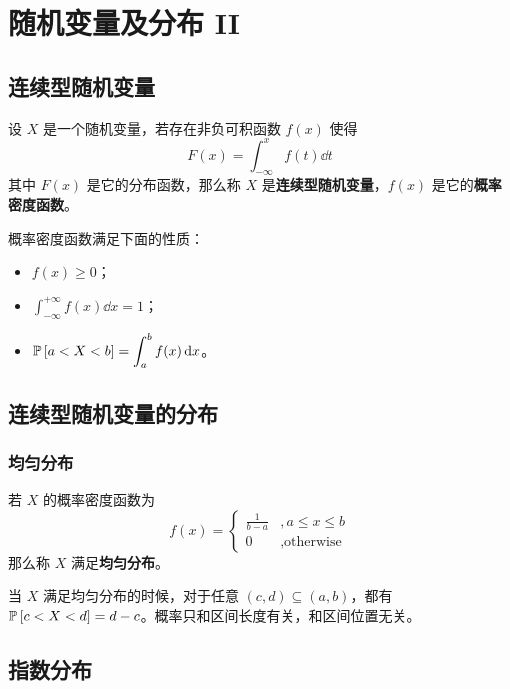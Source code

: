\section{随机变量及分布 II}

\subsection{连续型随机变量}

\begin{definition}
    设 $X$ 是一个随机变量，若存在非负可积函数 $f(x)$ 使得
    $$
    F(x) = \int_{- \infty}^{x} f(t) \dd{t}
    $$
    其中 $F(x)$ 是它的分布函数，那么称 $X$ 是\textbf{连续型随机变量}，$f(x)$ 是它的\textbf{概率密度函数}。
\end{definition}

概率密度函数满足下面的性质：
\begin{itemize}
    \item $f(x) \ge 0$；
    \item $\displaystyle\int_{- \infty}^{+ \infty} f(x) \dd{x} = 1$；
    \item $\displaystyle \operatorname{\mathbb{P}}\left[a < X < b\right] = \int_{a}^{b} f(x) \dd{x}$。
\end{itemize}

\subsection{连续型随机变量的分布}

\subsubsection{均匀分布}

\begin{definition}
    若 $X$ 的概率密度函数为
    $$
    f(x) = \begin{cases}
        \frac{1}{b - a} &, a \le x \le b \\
        0 &, \text{otherwise}
    \end{cases}
    $$
    那么称 $X$ 满足\textbf{均匀分布}。
\end{definition}

当 $X$ 满足均匀分布的时候，对于任意 $(c, d) \subseteq (a, b)$，都有 $\operatorname{\mathbb{P}}\left[c < X < d\right] = d - c$。概率只和区间长度有关，和区间位置无关。

\subsection{指数分布}

